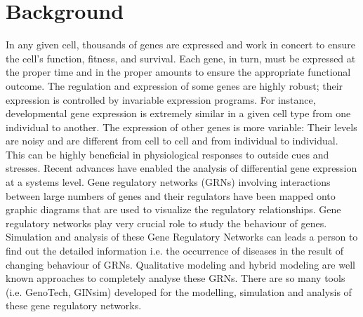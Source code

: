 \documentclass[twocolumn]{bmcart}%
\begin{document}

\section*{Background}
In any given cell, thousands of genes are expressed and work in concert to ensure the cell's function, fitness, and survival. Each gene, in turn, must be expressed at the proper time and in the proper amounts to ensure the appropriate functional outcome. The regulation and expression of some genes are highly robust; their expression is controlled by invariable expression programs. For instance, developmental gene expression is extremely similar in a given cell type from one individual to another. The expression of other genes is more variable: Their levels are noisy and are different from cell to cell and from individual to individual. This can be highly beneficial in physiological responses to outside cues and stresses. Recent advances have enabled the analysis of differential gene expression at a systems level. Gene regulatory networks (GRNs) involving interactions between large numbers of genes and their regulators have been mapped onto graphic diagrams that are used to visualize the regulatory relationships. Gene regulatory networks play very crucial role to study the behaviour of genes. Simulation and analysis of these Gene Regulatory Networks can leads a person to find out the detailed information i.e. the occurrence of diseases in the result of  changing behaviour of GRNs. Qualitative modeling and hybrid modeling are well known approaches to completely analyse these GRNs. There are so many tools (i.e. GenoTech, GINsim) developed for the modelling, simulation and analysis of these gene regulatory networks. 
\end{document}
